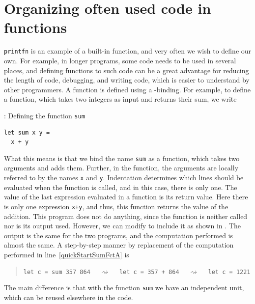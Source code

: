 \documentclass[fsharpNotes.tex]{subfiles}
\begin{document}
\section{Organizing often used code in functions}
\lstinline{printfn} is an example of a built-in function, and very often we wish to define our own. For example, in longer programs, some code needs to be used in several places, and defining functions to  such code can be a great advantage for reducing the length of code, debugging, and writing code, which is easier to understand by other programmers. A function is defined using a -binding. For example, to define a function, which takes two integers as input and returns their sum, we write
%
\begin{codeNOutput}[label=sumFunction,
  top=-5pt,
  bottom=-5pt,
  left=-2pt,
  right=-2pt,
]{: Defining the function \lstinline{sum}}
\begin{lstlisting}
let sum x y =
  x + y
\end{lstlisting} 
\end{codeNOutput}
%
What this means is that we bind the name \lstinline{sum} as a function, which takes two arguments and adds them. Further, in the function, the arguments are locally referred to by the names \lstinline{x} and \lstinline{y}. Indentation determines which lines should be evaluated when the function is called, and in this case, there is only one. The value of the last expression evaluated in a function is its return value. Here there is only one expression \lstinline{x+y}, and thus, this function returns the value of the addition. This program does not do anything, since the function is neither called nor is its output used. However, we can modify  to include it as shown in .
% 
%
The output is the same for the two programs, and the computation performed is almost the same. A step-by-step manner by replacement of the computation performed in line~\ref{quickStartSumFctA} is
\begin{quote}
  \lstinline{let c = sum 357 864} $\quad\rightsquigarrow\quad$  \lstinline{let c = 357 + 864}  $\quad\rightsquigarrow\quad$  \lstinline{let c = 1221}
\end{quote}
The main difference is that with the function \lstinline{sum} we have an independent unit, which can be reused elsewhere in the code.
\end{document}
